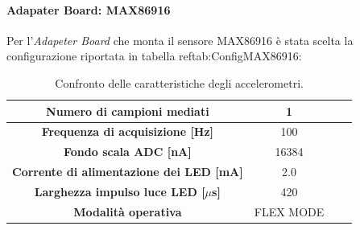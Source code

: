 \paragraph{Adapater Board: MAX86916}
Per l'\textit{Adapeter Board} che monta il sensore MAX86916 è stata scelta la configurazione riportata in tabella ref{tab:ConfigMAX86916}:
\begin{table}[h]
	\renewcommand{\arraystretch}{1.5}
	\centering
	\footnotesize
	\begin{tabular}{cccc}
		\textbf{Numero di campioni mediati} & 1 \\ \hline
		\textbf{Frequenza di acquisizione [Hz]} & 100 \\ \hline
		\textbf{Fondo scala ADC [nA]} & 16384 \\ \hline
		\textbf{Corrente di alimentazione dei LED [mA]} & 2.0 \\ \hline
		\textbf{Larghezza impulso luce LED [$\mu$s]} & 420 \\ \hline
		\textbf{Modalità operativa} & FLEX MODE \\ \hline
	\end{tabular}
	\caption{Confronto delle caratteristiche degli accelerometri.}
	\label{tab:ConfigMAX86916}
\end{table}
